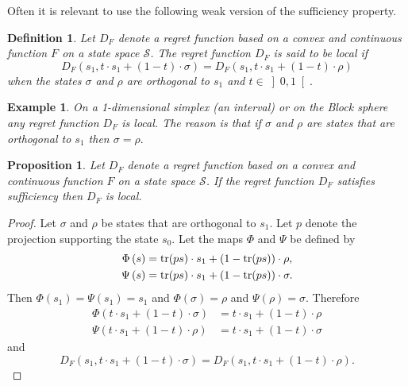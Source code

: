 \documentclass[10pt,a4paper,draft]{article}
\newtheorem{Prop}{Proposition}
\newtheorem{Definition}{Definition}
\newtheorem{Example}{Example}
\begin{document}
Often it is relevant to use the following weak version of the
sufficiency
property.
\begin{Definition}
Let $D_F$ denote a regret function based on a convex and continuous function $F$ on a state space ${\mathcal S}$. The regret function $D_{F}$ is said to be local if 
\[
D_{F}\left(s_{1},t\cdot s_{1}+\left(1-t\right)\cdot \sigma\right)=D_{F}\left(s_{1},t\cdot s_{1}+\left(1-t\right)\cdot \rho\right)
\]
when the states $\sigma$ and $\rho$ are orthogonal to
$s_{1}$
and $t\in\left]0,1\right[.$
\end{Definition}
\begin{Example}
On a 1-dimensional simplex (an interval) or on the Block sphere
any regret function $D_{F}$ is local.
The reason is that if $\sigma$ and $\rho$ are states that are
orthogonal
to $s_{1}$ then $\sigma=\rho.$
\end{Example}
\begin{Prop}Let $D_F$ denote a regret function based on a convex and continuous function $F$ on a state space ${\mathcal S}$. If the regret function $D_{F}$ satisfies sufficiency then $D_{F}$ is local. 
\end{Prop}
\begin{proof}
Let $\sigma$ and $\rho$ be states that are orthogonal to
$s_{1}.$ Let $p$ denote the projection supporting the state $s_0$.
 Let the maps $\Phi$ and $\Psi$ be defined by
\begin{align*}
\Phi\left(s\right) &
={\rm tr}(ps)\cdot s_{1}+(1-{\rm tr}(ps))\cdot \rho ,\\
\Psi\left(s\right) &
={\rm tr}(ps)\cdot s_{1}+(1-{\rm tr}(ps))\cdot \sigma.
\end{align*}
Then $\Phi\left(s_{1}\right)=\Psi\left(s_{1}\right)=s_{1}$ and
$\Phi\left(\sigma\right)=\rho$
and $\Psi\left(\rho\right)=\sigma.$ Therefore 
\begin{align*}
\Phi\left(t\cdot s_{1}+\left(1-t\right)\cdot \sigma\right) &
=t\cdot s_{1}+\left(1-t\right)\cdot \rho\\
\Psi\left(t\cdot s_{1}+\left(1-t\right)\cdot \rho\right) &
=t\cdot s_{1}+\left(1-t\right)\cdot \sigma
\end{align*}
 and 
\[
D_{F}\left(s_{1},t\cdot s_{1}+\left(1-t\right)\cdot \sigma\right)=D_{F}\left(s_{1},t\cdot s_{1}+\left(1-t\right)\cdot \rho\right).
\]
\end{proof}
\end{document}
